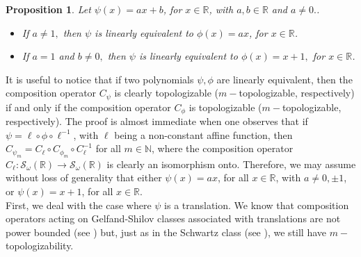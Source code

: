 \documentclass[12pt,reqno]{amsart} %
\newtheorem{prop}[theorem]{Proposition}
\numberwithin{equation}{section}
\begin{document}
\begin{prop} Let $\psi(x) = a x + b$, for  $x\in\mathbb{R}$, with $a,b\in {\mathbb R}$ and $a\neq 0.$.
\begin{itemize}
	\item[(a)] If $a\neq 1,$ then $\psi$ is linearly equivalent to $\phi(x) = ax$, for $x\in \mathbb{R}$. 
	\item[(b)] If $a = 1$ and $b\neq 0,$ then $\psi$ is linearly equivalent to $\phi(x) = x + 1,$ for $x\in\mathbb{R}$.
\end{itemize}
\end{prop}
It is useful to notice that if two polynomials $\psi, \phi$ are linearly equivalent, then the composition operator $C_\psi$ is clearly topologizable ($m-$topologizable, respectively) if and only if the composition operator $C_\phi$ is topologizable ($m-$topologizable, respectively). The proof is almost immediate when one observes that if $\psi=\ell \circ \phi\circ \ell^{-1}$, with $\ell$ being a non-constant affine function, then $C_{\psi_m}=C_\ell \circ C_{\phi_m}\circ C_{\ell}^{-1}$ for all $m\in\mathbb{N}$, where  the composition operator $C_\ell: \mathcal{S}_{\omega}(\mathbb{R})\to \mathcal{S}_{\omega}(\mathbb{R})$ is clearly an isomorphism onto. Therefore,  we may assume without loss of generality that either $\psi(x)=a x$, for  all $x\in\mathbb{R}$, with $a\not =0, \pm 1$,  or $\psi(x)=x+1$, for all $x\in\mathbb{R}$.\\







			
			
			
			
			
			
			First, we  deal with the case where $\psi$ is a translation. We know that composition operators acting on Gelfand-Shilov classes associated with translations are not power bounded (see \cite[Proposition 3.1]{RACSAM}) but, just as in the Schwartz class (see \cite[Example 4.14.]{akj}), we still have $m-$topologizability.
			
\end{document}

